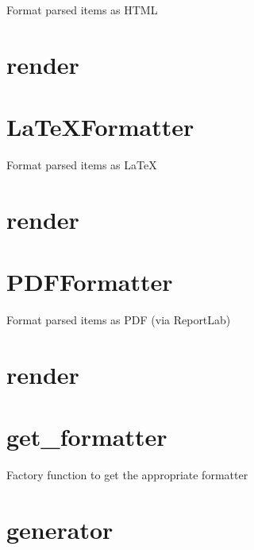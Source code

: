 \documentclass{article}
\begin{document}
Format parsed items as HTML







\section{render}








\section{LaTeXFormatter}


Format parsed items as LaTeX







\section{render}








\section{PDFFormatter}


Format parsed items as PDF (via ReportLab)







\section{render}








\section{get_formatter}


Factory function to get the appropriate formatter







\section{generator}
\end{document}
